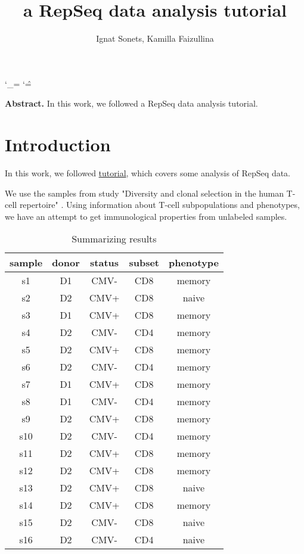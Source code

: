 \documentclass{article}
\title{a RepSeq data analysis tutorial }
\author{ Ignat Sonets, Kamilla Faizullina}
\date{\empty}
\begin{document}
 	
 	\catcode`\_=\active
 	\catcode`\^=\active
 	
 	\maketitle
 	
 	\textbf{Abstract.}  In this work, we followed a RepSeq data analysis tutorial.  
 	\section{Introduction}
In this work, we followed \href{https://github.com/antigenomics/repseq-annotation-tutorial}{tutorial}, which covers some analysis of RepSeq data.


We use the samples from study "Diversity and clonal selection in the human T-cell repertoire" \cite{pnas}. Using information about T-cell subpopulations and phenotypes, we have an attempt to get immunological properties from unlabeled samples. 

   	\begin{table}[h]
 	\centering
 	\begin{tabular}{|c|c|c|c|c|}
 		\hline
 	sample &	donor &	status &	subset&	phenotype \\ \hline
 	s1	& D1	&	CMV-		& CD8 &	memory \\ \hline
 	s2	&D2		&CMV+	&	CD8	& naive \\ \hline
 	s3	&D1		&CMV+	&	CD8	& memory\\ \hline
 	s4	&D2		&CMV-	&	CD4	& memory\\ \hline
 	s5	&D2		&CMV+	&	CD8	& memory\\ \hline
 	s6	&D2		&CMV-	&	CD4	& memory\\ \hline
 	s7	&D1		&CMV+	&	CD8	& memory\\ \hline
 	s8	&D1		&CMV-	&	CD4	& memory\\ \hline
 	s9	&D2		&CMV+	&	CD8	& memory\\ \hline
 	s10	&D2		&CMV-	&	CD4	& memory\\ \hline		
 	s11	&D2		&CMV+	&	CD8	& memory\\ \hline
 	s12	&D2		&CMV+	&	CD8 &	memory\\ \hline
 	s13	&D2		&CMV+	&	CD8	&naive\\ \hline
 	s14	&D2		&CMV+	&	CD8	&memory\\ \hline
 	s15	&D2		&CMV-	&	CD8	&naive\\ \hline
 	s16&	D2	&	CMV-	&	CD4	&naive\\ \hline
 		
 		\hline	 
 		
 	\end{tabular}
  	\caption{ Summarizing results  }
  \label{tab:var}
\end{table}
\end{document}
